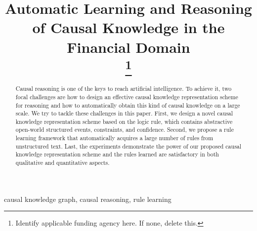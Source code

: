 \documentclass[conference]{IEEEtran}
\begin{document}
	\title{Automatic Learning and Reasoning of Causal Knowledge in the Financial Domain\\
		\thanks{Identify applicable funding agency here. If none, delete this.}
	}
	\author{
		\and
		\and
		\and
	}
	\maketitle
\begin{abstract}
Causal reasoning is one of the keys to reach artificial intelligence. 
To achieve it, two focal challenges are how to design an effective causal knowledge representation scheme for reasoning and how to automatically obtain this kind of causal knowledge on a large scale. 
We try to tackle these challenges in this paper. 
First, we design a novel causal knowledge representation scheme based on the logic rule, which contains abstractive open-world structured events, constraints, and confidence.
Second, we propose a rule learning framework that automatically acquires a large number of rules from unstructured text. 
Last, the experiments demonstrate the power of our proposed causal knowledge representation scheme and the rules learned are satisfactory in both qualitative and quantitative aspects.
\end{abstract}
	
\begin{IEEEkeywords}
	causal knowledge graph, causal reasoning, rule learning
\end{IEEEkeywords}
	
\begin{CJK}{UTF8}{gkai}
	
	
	
	
	
	
\end{CJK}
\end{document}
